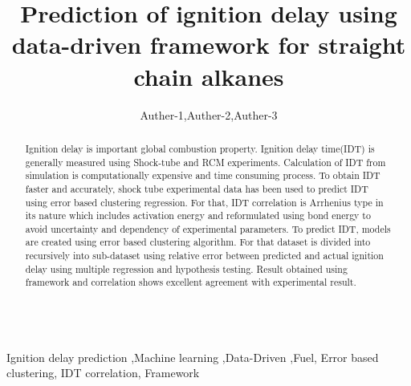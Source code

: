 \documentclass[preprint,12pt]{elsarticle}
\begin{document}
	
	\begin{frontmatter}
		
		
		\title{Prediction of ignition delay using  data-driven framework for straight chain alkanes}
		
		
		
		
		\author{Auther-1,Auther-2,Auther-3 }
		
		\address{Indian Institute of Technology, Madras}
		
		\begin{abstract}
		 Ignition delay is important global combustion property. Ignition delay time(IDT) is generally measured using Shock-tube and RCM experiments. Calculation of IDT from simulation is computationally expensive and time consuming process. To obtain IDT faster and accurately, shock tube experimental data has been used to predict IDT using error based clustering regression. For that, IDT correlation is Arrhenius type in its nature which includes activation energy and reformulated using bond energy to avoid uncertainty and dependency of experimental parameters. To predict IDT, models are created using error based clustering algorithm. For that dataset is divided into recursively into sub-dataset using relative error between predicted and actual ignition delay using multiple regression and hypothesis testing. Result obtained  using framework and correlation shows excellent agreement with experimental result.  
		\end{abstract}
		
		\begin{keyword}
			\\
			Ignition delay prediction \sep Machine learning \sep Data-Driven ,Fuel, Error based clustering, IDT correlation, Framework
			
		\end{keyword}
		
	\end{frontmatter}
	
\end{document}
